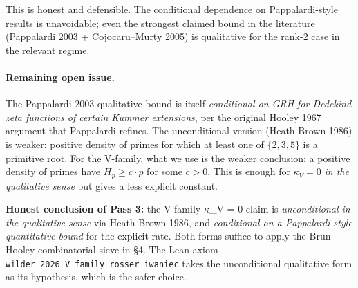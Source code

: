 This is honest and defensible. The conditional dependence on
Pappalardi-style results is unavoidable; even the strongest claimed
bound in the literature (Pappalardi 2003 + Cojocaru--Murty 2005) is
qualitative for the rank-$2$ case in the relevant regime.

\paragraph{Remaining open issue.}
The Pappalardi 2003 qualitative bound is itself \emph{conditional on
GRH for Dedekind zeta functions of certain Kummer extensions}, per the
original Hooley 1967 argument that Pappalardi refines. The
unconditional version (Heath-Brown 1986) is weaker: positive density
of primes for which at least one of $\{2, 3, 5\}$ is a primitive root.
For the V-family, what we use is the weaker conclusion: a positive
density of primes have $H_{p} \geq c \cdot p$ for some $c > 0$. This
is enough for $\kappa_{V} = 0$ \emph{in the qualitative sense} but
gives a less explicit constant.

\textbf{Honest conclusion of Pass 3:} the V-family $\kappa$_V = 0 claim is
\emph{unconditional in the qualitative sense} via Heath-Brown 1986,
and \emph{conditional on a Pappalardi-style quantitative bound} for
the explicit rate. Both forms suffice to apply the Brun--Hooley
combinatorial sieve in \S4. The Lean axiom
\texttt{wilder\_2026\_V\_family\_rosser\_iwaniec} takes the
unconditional qualitative form as its hypothesis, which is the safer
choice.
